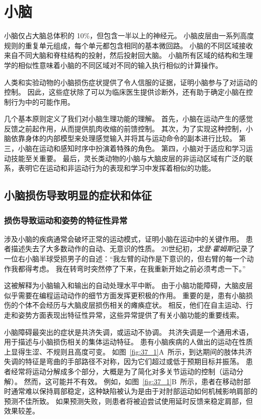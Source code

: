 \chapter{小脑} \label{chap:chap37}

小脑仅占大脑总体积的 10\%，但包含一半以上的神经元。
小脑皮层由一系列高度规则的重复单元组成，每个单元都包含相同的基本微回路。
小脑的不同区域接收来自不同大脑和脊柱结构的投射，然后投射回大脑。
小脑所有区域的结构和生理学的相似性意味着小脑的不同区域对不同的输入执行相似的计算操作。


人类和实验动物的小脑损伤症状提供了令人信服的证据，证明小脑参与了对运动的控制。
因此，这些症状除了可以为临床医生提供诊断外，还有助于确定小脑在控制行为中的可能作用。


几个基本原则定义了我们对小脑生理功能的理解。
首先，小脑在运动产生的感觉反馈之前起作用，从而提供肌肉收缩的前馈控制。
其次，为了实现这种控制，小脑依靠身体的内部模型来处理感觉输入并将其与运动命令的副本进行比较。
第三，小脑在运动和感知时序中扮演着特殊的角色。
第四，小脑对于适应和学习运动技能至关重要。
最后，灵长类动物的小脑与大脑皮层的非运动区域有广泛的联系，表明它在运动和非运动行为的表现和学习中发挥着相似的功能。



\section{小脑损伤导致明显的症状和体征}

\subsection{损伤导致运动和姿势的特征性异常}

涉及小脑的疾病通常会破坏正常的运动模式，证明小脑在运动中的关键作用。
患者描述失去了大多数动作的自动、无意识的性质。
20世纪初，\textit{戈登$\cdot$霍姆斯}记录了一位右小脑半球受损男子的自述：“我左臂的动作是下意识的，但右臂的每一个动作我都得考虑。
我在转弯时突然停了下来，在我重新开始之前必须考虑一下。”


这被解释为小脑输入和输出的自动处理水平中断。
由于小脑功能障碍，大脑皮层似乎需要在编程运动动作的细节方面发挥更积极的作用。
重要的是，患有小脑损伤的个体不会经历与大脑皮层损伤相关的瘫痪症状。
相反，他们在自主运动、行走和姿势方面表现出特征性异常，这些异常提供了有关小脑功能的重要线索。


小脑障碍最突出的症状是共济失调，或运动不协调。
共济失调是一个通用术语，用于描述与小脑损伤相关的集体运动特征。
患有小脑疾病的人做出的运动在性质上显得生涩、不规则且高度可变。 
如图~\ref{fig:37_1}A~所示，到达期间的肢体共济失调的特征是弯曲的手部路径不对称，因为它们超过或低于预期目标并振荡。
患者经常将运动分解成多个部分，大概是为了简化对多关节运动的控制（运动分解）。
然而，这可能并不有效。
例如，如图~\ref{fig:37_1}B~所示，患者在移动肘部时通常难以保持肩部稳定，这种缺陷被认为是由于对肘部运动如何机械影响肩部的预测不佳所致。
如果预测失败，则患者将被迫尝试使用延时反馈来稳定肩部，但效果较差。


